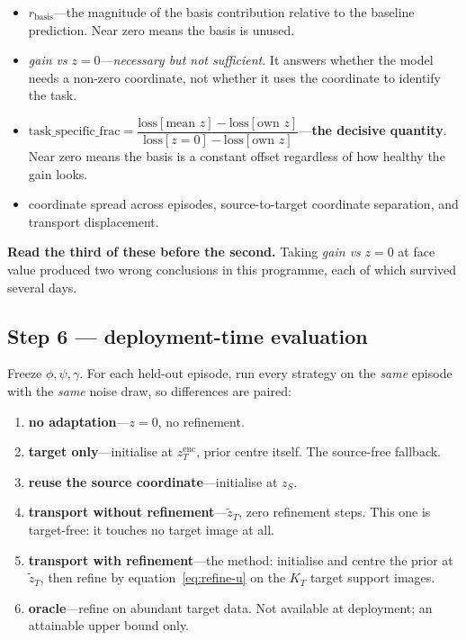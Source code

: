\documentclass[11pt]{article}
\newcommand{\KT}{K_{T}}
\newcommand{\zS}{z_{S}}
\newcommand{\zencT}{z^{\mathrm{enc}}_{T}}
\newcommand{\ztilT}{\tilde{z}_{T}}
\begin{document}
\begin{itemize}[leftmargin=*, itemsep=3pt]
\item $r_{\text{basis}}$---the magnitude of the basis contribution relative to the baseline
      prediction. Near zero means the basis is unused.
\item \textit{gain vs} $z=0$---\emph{necessary but not sufficient}. It answers whether the model
      needs a non-zero coordinate, not whether it uses the coordinate to identify the task.
\item $\text{task\_specific\_frac} = \dfrac{\text{loss}[\text{mean }z]-\text{loss}[\text{own }z]}
      {\text{loss}[z{=}0]-\text{loss}[\text{own }z]}$---\textbf{the decisive quantity}. Near zero
      means the basis is a constant offset regardless of how healthy the gain looks.
\item coordinate spread across episodes, source-to-target coordinate separation, and transport
      displacement.
\end{itemize}

\textbf{Read the third of these before the second.} Taking \textit{gain vs} $z=0$ at face value
produced two wrong conclusions in this programme, each of which survived several days.

\subsection*{Step 6 --- deployment-time evaluation}

Freeze $\phi,\psi,\gamma$. For each held-out episode, run every strategy on the \emph{same} episode
with the \emph{same} noise draw, so differences are paired:

\begin{enumerate}[leftmargin=*, itemsep=3pt]
\item \textbf{no adaptation}---$z=0$, no refinement.
\item \textbf{target only}---initialise at $\zencT$, prior centre itself. The source-free fallback.
\item \textbf{reuse the source coordinate}---initialise at $\zS$.
\item \textbf{transport without refinement}---$\ztilT$, zero refinement steps. This one is
      target-free: it touches no target image at all.
\item \textbf{transport with refinement}---the method: initialise and centre the prior at $\ztilT$,
      then refine by equation~\eqref{eq:refine-u} on the $\KT$ target support images.
\item \textbf{oracle}---refine on abundant target data. Not available at deployment; an attainable
      upper bound only.
\end{enumerate}
\end{document}
